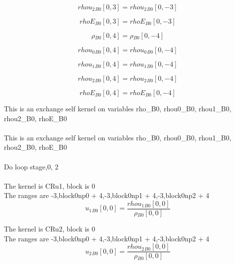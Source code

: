 \documentclass{article}
\begin{document}
\begin{dmath}{rhou_{2}{_{B0}}}[{0,3}] = {rhou_{2}{_{B0}}}[{0,-3}]\end{dmath}

\begin{dmath}{rhoE{_{B0}}}[{0,3}] = {rhoE{_{B0}}}[{0,-3}]\end{dmath}

\begin{dmath}{\rho{_{B0}}}[{0,4}] = {\rho{_{B0}}}[{0,-4}]\end{dmath}

\begin{dmath}{rhou_{0}{_{B0}}}[{0,4}] = {rhou_{0}{_{B0}}}[{0,-4}]\end{dmath}

\begin{dmath}{rhou_{1}{_{B0}}}[{0,4}] = {rhou_{1}{_{B0}}}[{0,-4}]\end{dmath}

\begin{dmath}{rhou_{2}{_{B0}}}[{0,4}] = {rhou_{2}{_{B0}}}[{0,-4}]\end{dmath}

\begin{dmath}{rhoE{_{B0}}}[{0,4}] = {rhoE{_{B0}}}[{0,-4}]\end{dmath}

\noindent This is an exchange self kernel on variables rho_B0, rhou0_B0, rhou1_B0, rhou2_B0, rhoE_B0\\\\\noindent This is an exchange self kernel on variables rho_B0, rhou0_B0, rhou1_B0, rhou2_B0, rhoE_B0\\\\\noindent Do loop stage,0, 2\\
\\\noindent The kernel is CRu1, block is 0\\\noindent The ranges are -3,block0np0 + 4,-3,block0np1 + 4,-3,block0np2 + 4\\\begin{dmath}{u_{1}{_{B0}}}[{0,0}] = \frac{{rhou_{1}{_{B0}}}[{0,0}]}{{\rho{_{B0}}}[{0,0}]}\end{dmath}

\noindent The kernel is CRu2, block is 0\\\noindent The ranges are -3,block0np0 + 4,-3,block0np1 + 4,-3,block0np2 + 4\\\begin{dmath}{u_{2}{_{B0}}}[{0,0}] = \frac{{rhou_{2}{_{B0}}}[{0,0}]}{{\rho{_{B0}}}[{0,0}]}\end{dmath}
\end{document}
